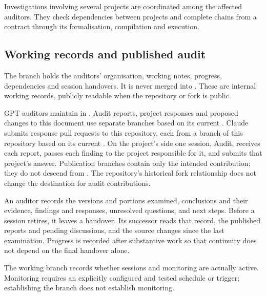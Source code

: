 Investigations involving several projects are coordinated among the affected auditors. They check dependencies between projects and complete chains from a contract through its formalisation, compilation and execution.



\subsection{Working records and published audit}

The branch  holds the auditors' organisation, working notes, progress, dependencies and session handovers. It is never merged into . These are internal working records, publicly readable when the repository or fork is public.

GPT auditors maintain  in . Audit reports, project responses and proposed changes to this document use separate branches based on its current . Claude submits response pull requests to this repository, each from a branch of this repository based on its current . On the project's side one session, Audit, receives each report, passes each finding to the project responsible for it, and submits that project's answer. Publication branches contain only the intended contribution; they do not descend from . The repository's historical fork relationship does not change the destination for audit contributions.

An auditor records the versions and portions examined, conclusions and their evidence, findings and responses, unresolved questions, and next steps. Before a session retires, it leaves a handover. Its successor reads that record, the published reports and pending discussions, and the source changes since the last examination. Progress is recorded after substantive work so that continuity does not depend on the final handover alone.

The working branch records whether sessions and monitoring are actually active. Monitoring requires an explicitly configured and tested schedule or trigger; establishing the branch does not establish monitoring.
